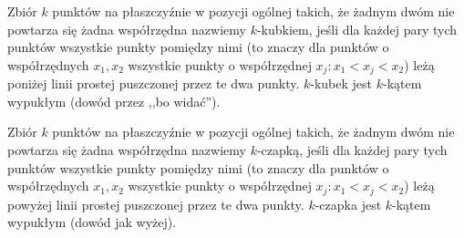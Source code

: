 \begin{definition}
	Zbiór \(k\) punktów na płaszczyźnie w pozycji ogólnej takich, że żadnym dwóm nie powtarza się żadna współrzędna nazwiemy \(k\)-kubkiem, jeśli dla każdej pary tych punktów wszystkie punkty pomiędzy nimi (to znaczy dla punktów o współrzędnych \(x_1,x_2\) wszystkie punkty o współrzędnej \(x_j : x_1 < x_j < x_2\)) leżą poniżej linii prostej puszczonej przez te dwa punkty. \(k\)-kubek jest \(k\)-kątem wypukłym (dowód przez ,,bo widać'').
\end{definition}

\begin{definition}
	Zbiór \(k\) punktów na płaszczyźnie w pozycji ogólnej takich, że żadnym dwóm nie powtarza się żadna współrzędna nazwiemy \(k\)-czapką, jeśli dla każdej pary tych punktów wszystkie punkty pomiędzy nimi (to znaczy dla punktów o współrzędnych \(x_1,x_2\) wszystkie punkty o współrzędnej \(x_j : x_1 < x_j < x_2\)) leżą powyżej linii prostej puszczonej przez te dwa punkty. \(k\)-czapka jest \(k\)-kątem wypukłym (dowód jak wyżej).
\end{definition}

